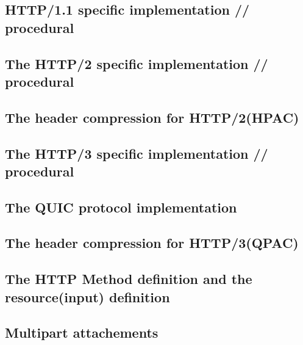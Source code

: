 \documentclass[10pt,a4paper,english]{article}
\begin{document}
\begin{multicols}{2}
\subsection{HTTP/1.1 specific implementation // procedural}
\begin{flushleft}
\end{flushleft}
\subsection{The HTTP/2 specific implementation // procedural}
\begin{flushleft}
\end{flushleft}
\subsection{The header compression for HTTP/2(HPAC)}
\begin{flushleft}
\end{flushleft}
\subsection{The HTTP/3 specific implementation // procedural}
\begin{flushleft}
\end{flushleft}
\subsection{The QUIC protocol implementation}
\begin{flushleft}
\end{flushleft}
\subsection{The header compression for HTTP/3(QPAC)}
\begin{flushleft}
\end{flushleft}
\subsection{The HTTP Method definition and the resource(input) definition}
\begin{flushleft}
\end{flushleft}
\subsection{Multipart attachements}
\begin{flushleft}
\end{flushleft}

\end{multicols}
\end{document}
